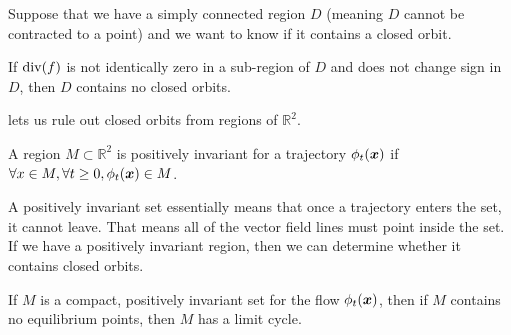 Suppose that we have a simply connected region $D$ (meaning $D$ cannot be
contracted to a point) and we want to know if it contains a closed orbit.
\begin{theorem}
	If $\operatorname*{div}(f)$ is not identically zero in a sub-region of $D$ and does not
	change sign in $D$, then $D$ contains no closed orbits.
	\label{thm:bendixons}
\end{theorem}
 lets us rule out closed orbits from regions of
$\mathbb{R}^2$.
\begin{definition}
	A region $M \subset \mathbb{R}^2$ is positively invariant for a trajectory
	$\phi_t(\boldsymbol{x})$ if $\forall x\in M, \forall t \geq 0, \phi_t(\boldsymbol{x}) \in M$.
	\label{defn:positive-invariance}
\end{definition}
A positively invariant set essentially means that once a trajectory enters the
set, it cannot leave. That means all of the vector field lines must point inside
the set.
If we have a positively invariant region, then we can determine whether it
contains closed orbits.
\begin{theorem}
	If $M$ is a compact, positively invariant set for the flow $\phi_t(\boldsymbol{x})$,
	then if $M$ contains no equilibrium points, then $M$ has a limit cycle.
	\label{thm:poincare-bendixson}
\end{theorem}


